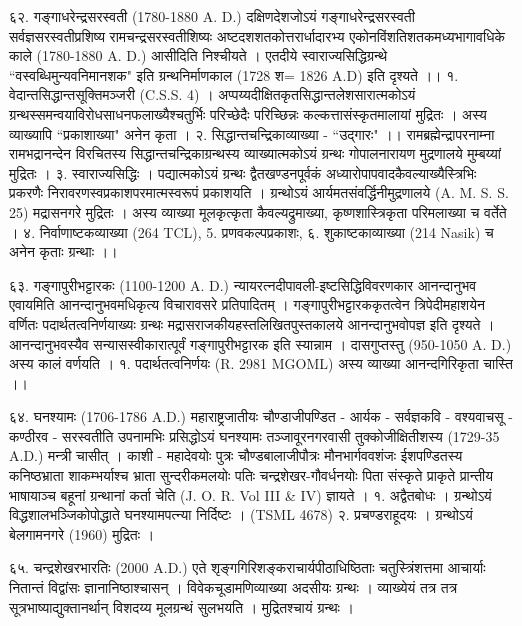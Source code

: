 ६२. गङ्गाधरेन्द्रसरस्वती (1780-1880 A. D.)
दक्षिणदेशजोऽयं गङ्गाधरेन्द्रसरस्वती सर्वज्ञसरस्वतीप्रशिष्य रामचन्द्रसरस्वतीशिष्यः अष्टदशशतकोत्तरार्धादारभ्य एकोनविंशतिशतकमध्यभागावधिके काले (1780-1880 A. D.) आसीदिति निश्चीयते । एतदीये स्वाराज्यसिद्धिग्रन्थे ``वस्वब्धिमुन्यवनिमानशक" इति ग्रन्थनिर्माणकाल (1728 श= 1826 A.D) इति दृश्यते ।।
१. वेदान्तसिद्धान्तसूक्तिमञ्जरी (C.S.S. 4) । अप्पय्यदीक्षितकृतसिद्धान्तलेशसारात्मकोऽयं ग्रन्थस्समन्वयाविरोधसाधनफलाख्यैश्चतुर्भिः परिच्छेदैः परिच्छिन्नः कल्कत्तासंस्कृतमालायां मुद्रितः । अस्य व्याख्यापि ``प्रकाशाख्या" अनेन कृता ।
२. सिद्धान्तचन्द्रिकाव्याख्या - ``उद्गारः" ।। रामब्रह्मेन्द्रापरनाम्ना रामभद्रानन्देन विरचितस्य सिद्धान्तचन्द्रिकाग्रन्थस्य व्याख्यात्मकोऽयं ग्रन्थः गोपालनारायण मुद्रणालये मुम्बय्यां मुद्रितः ।
३. स्वाराज्यसिद्धिः । पद्यात्मकोऽयं ग्रन्थः द्वैतखण्डनपूर्वकं अध्यारोपापवादकैवल्याख्यैस्त्रिभिः प्रकरणैः निरावरणस्वप्रकाशपरमात्मस्वरूपं प्रकाशयति । ग्रन्थोऽयं आर्यमतसंवर्द्धिनीमुद्रणालये (A. M. S. S. 25) मद्रासनगरे मुद्रितः । अस्य व्याख्या मूलकृत्कृता कैवल्यद्रुमाख्या, कृष्णशास्त्रिकृता परिमलाख्या च वर्तेते ।
४. निर्वाणाष्टकव्याख्या (264 TCL), 5. प्रणवकल्पप्रकाशः,
६. शुकाष्टकाव्याख्या (214 Nasik) च अनेन कृताः ग्रन्थाः ।।

६३. गङ्गापुरीभट्टारकः (1100-1200 A. D.)
न्यायरत्नदीपावली-इष्टसिद्धिविवरणकार आनन्दानुभव एवायमिति आनन्दानुभवमधिकृत्य विचारावसरे प्रतिपादितम् । गङ्गापुरीभट्टारककृतत्वेन त्रिपेदीमहाशयेन वर्णितः पदार्थतत्वनिर्णयाख्यः ग्रन्थः मद्रासराजकीयहस्तलिखितपुस्तकालये आनन्दानुभवोपज्ञ इति दृश्यते । आनन्दानुभवस्यैव सन्यासस्वीकारात्पूर्वं गङ्गापुरीभट्टारक इति स्यान्नाम । दासगुप्तस्तु (950-1050 A. D.) अस्य कालं वर्णयति ।
१. पदार्थतत्वनिर्णयः (R. 2981 MGOML) अस्य व्याख्या आनन्दगिरिकृता चास्ति ।।

६४. घनश्यामः (1706-1786 A.D.)
महाराष्ट्रजातीयः चौण्डाजीपण्डित - आर्यक - सर्वज्ञकवि - वश्यवाचसू - कण्ठीरव - सरस्वतीति उपनामभिः प्रसिद्धोऽयं घनश्यामः तञ्जावूरनगरवासी तुक्कोजीक्षितीशस्य (1729-35 A.D.) मन्त्री चासीत् । काशी - महादेवयोः पुत्रः चौण्डबालाजीपौत्रः मौनभार्गववशंजः ईशपण्डितस्य कनिष्ठभ्राता शाकम्भर्याश्च भ्राता सुन्दरीकमलयोः पतिः चन्द्रशेखर-गौवर्धनयोः पिता संस्कृते प्राकृते प्रान्तीय भाषायाञ्च बहूनां ग्रन्थानां कर्ता चेति (J. O. R. Vol III & IV) ज्ञायते ।
१. अद्वैतबोधः । ग्रन्थोऽयं विद्धशालभञ्जिकोपोद्धाते घनश्यामपत्न्या निर्दिष्टः । (TSML 4678)
२. प्रचण्डराहूदयः । ग्रन्थोऽयं बेलगामनगरे (1960) मुद्रितः ।

६५. चन्द्रशेखरभारतिः (2000 A.D.)
एते शृङ्गगिरिशङ्कराचार्यपीठाधिष्ठिताः चतुस्त्रिंशत्तमा आचार्याः नितान्तं विद्वांसः ज्ञानानिष्ठाश्चासन् । विवेकचूडामणिव्याख्या अदसीयः ग्रन्थः । व्याख्येयं तत्र तत्र सूत्रभाष्याद्युक्तानर्थान् विशदय्य मूलग्रन्थं सुलभयति । मुद्रितश्चायं ग्रन्थः ।


